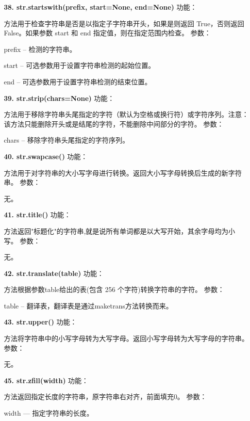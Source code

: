 \documentclass{book}
\begin{document}
\begin{CJK}{UTF8}{gbsn}
\noindent \textbf{38. str.startswith(prefix, start=None, end=None)} \newline
功能：\par 方法用于检查字符串是否是以指定子字符串开头，如果是则返回 True，否则返回 False。如果参数 start 和 end 指定值，则在指定范围内检查。\newline
参数：\par prefix -- 检测的字符串。
	 \par start -- 可选参数用于设置字符串检测的起始位置。
	 \par end -- 可选参数用于设置字符串检测的结束位置。
\newline
 
\noindent \textbf{39. str.strip(chars=None)} \newline
功能：\par 方法用于移除字符串头尾指定的字符（默认为空格或换行符）或字符序列。注意：该方法只能删除开头或是结尾的字符，不能删除中间部分的字符。\newline
参数：\par chars -- 移除字符串头尾指定的字符序列。
\newline

\noindent \textbf{40. str.swapcase()} \newline
功能：\par 方法用于对字符串的大小写字母进行转换。返回大小写字母转换后生成的新字符串。\newline
参数：\par 无。
\newline

\noindent \textbf{41. str.title()} \newline
功能：\par 方法返回"标题化"的字符串,就是说所有单词都是以大写开始，其余字母均为小写。\newline
参数：\par 无。
\newline

\noindent \textbf{42. str.translate(table)} \newline
功能：\par 方法根据参数table给出的表(包含 256 个字符)转换字符串的字符。\newline
参数：\par table -- 翻译表，翻译表是通过maketrans方法转换而来。
\newline

\noindent \textbf{43. str.upper()} \newline
功能：\par 方法将字符串中的小写字母转为大写字母。返回小写字母转为大写字母的字符串。\newline
参数：\par 无。
\newline

\noindent \textbf{45. str.zfill(width)} \newline
功能：\par 方法返回指定长度的字符串，原字符串右对齐，前面填充0。\newline
参数：\par width --- 指定字符串的长度。
\newline


\end{CJK}
\end{document}

